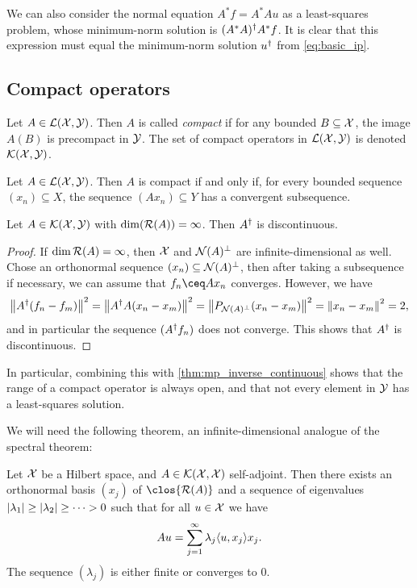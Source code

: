 \begin{remark}
    We can also consider the normal equation $A^* f = A^* A u$ as a least-squares problem, whose minimum-norm solution is $(A^* A)^\dagger A^* f$. It is clear that this expression must equal the minimum-norm solution $u^\dagger$ from \cref{eq:basic_ip}. 
\end{remark}

\subsection{Compact operators}
\begin{definition}
    Let $A \in \mathcal L(\mathcal X, \mathcal Y)$. Then $A$ is called \emph{compact} if for any bounded $B \subseteq \mathcal X$, the image $A(B)$ is precompact in $\mathcal Y$. The set of compact operators in $\mathcal L(\mathcal X, \mathcal Y)$ is denoted $\mathcal K(\mathcal X, \mathcal Y)$. 
\end{definition}

\begin{lemma}
    Let $A \in \mathcal L(\mathcal X, \mathcal Y)$. Then $A$ is compact if and only if, for every bounded sequence $(x_n) \subseteq X$, the sequence $(Ax_n) \subseteq Y$ has a convergent subsequence. 
\end{lemma}

\begin{theorem}
    Let $A \in \mathcal K(\mathcal X, \mathcal Y)$ with $\dim(\operatorname{\mathcal R}(A)) = \infty$. Then $A^\dagger$ is discontinuous. 
\end{theorem}

\begin{proof}
    If $\dim\operatorname{\mathcal R}(A) = \infty$, then $\mathcal X$ and $\operatorname{\mathcal N}(A)^\perp$ are infinite-dimensional as well. Chose an orthonormal sequence $(x_n) \subseteq \operatorname{\mathcal N}(A)^\perp$, then after taking a subsequence if necessary, we can assume that $f_n \ceq Ax_n$ converges. However, we have
    \[
    \norm{A^\dagger(f_n - f_m)}^2 = \norm{A^\dagger A (x_n - x_m)}^2 = \norm{P_{\operatorname{\mathcal N}(A)^\perp} (x_n - x_m)}^2 = \norm{x_n -x_m}^2 = 2, 
    \]
    and in particular the sequence $(A^\dagger f_n)$ does not converge. This shows that $A^\dagger$ is discontinuous. 
\end{proof}

In particular, combining this with \cref{thm:mp_inverse_continuous} shows that the range of a compact operator is always open, and that not every element in $\mathcal Y$ has a least-squares solution. 

We will need the following theorem, an infinite-dimensional analogue of the spectral theorem: 
\begin{theorem} Let $\mathcal X$ be a Hilbert space, and $A \in \mathcal K(\mathcal X, \mathcal X)$ self-adjoint. Then there exists an orthonormal basis $(x_j)$ of $
   \clos{\Ran(A)}$ and a sequence of eigenvalues $\abs{\lambda_1} \geq \abs{\lambda_2} \geq \dotsb > 0$ such that for all $u \in \mathcal X$ we have
    \[
    Au = \sum_{j=1}^\infty \lambda_j \langle u, x_j\rangle x_j. 
    \]
The sequence $(\lambda_j)$ is either finite or converges to 0. 
\end{theorem}

